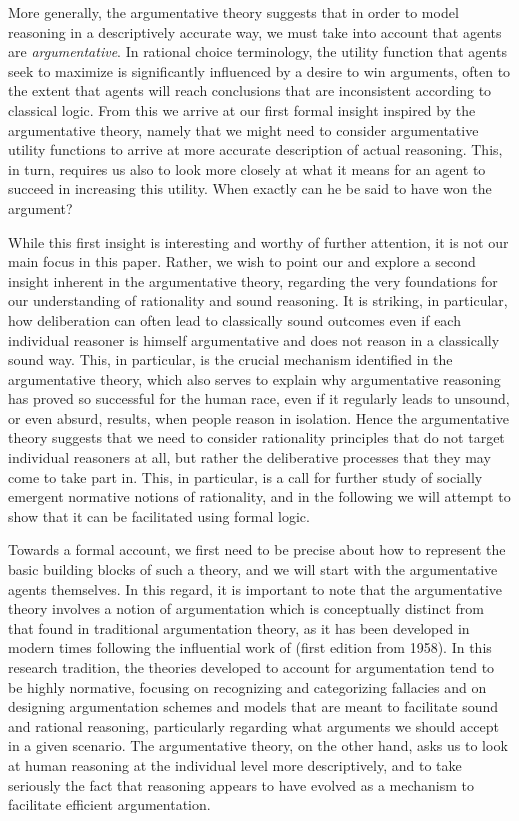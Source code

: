 \documentclass[greybox]{svmult}
\begin{document}
More generally, the argumentative theory suggests that in order to model reasoning in a descriptively accurate way, we must take into account that agents are \emph{argumentative}. In rational choice terminology, the utility function that agents seek to maximize is significantly influenced by a desire to win arguments, often to the extent that agents will reach conclusions that are inconsistent according to classical logic. From this we arrive at our first formal insight inspired by the argumentative theory, namely that we might need to consider argumentative utility functions to arrive at more accurate description of actual reasoning. This, in turn, requires us also to look more closely at what it means for an agent to succeed in increasing this utility. When exactly can he be said to have won the argument?

While this first insight is interesting and worthy of further attention, it is not our main focus in this paper. Rather, we wish to point our and explore a second insight inherent in the argumentative theory, regarding the 
very foundations for our understanding of rationality and sound reasoning. It is striking, in particular, how deliberation can often lead to classically sound outcomes even if each individual reasoner is himself argumentative and does not reason in a classically sound way. This, in particular, is the crucial mechanism identified in the argumentative theory, which also serves to explain why argumentative reasoning has proved so successful for the human race, even if it regularly leads to unsound, or even absurd, results, when people reason in isolation. Hence the argumentative theory suggests that we need to consider rationality principles that do not target individual reasoners at all, but rather the deliberative processes that they may come to take part in. This, in particular, is a call for further study of socially emergent normative notions of rationality, and in the following we will attempt to show that it can be facilitated using formal logic.

Towards a formal account, we first need to be precise about how to represent the basic building blocks of such a theory, and we will start with the argumentative agents themselves. In this regard, it is important to note that the argumentative theory involves a notion of argumentation which is conceptually distinct from that found in traditional argumentation theory, as it has been developed in modern times following the influential work of \cite{toulmin} (first edition from 1958). In this research tradition, the theories developed to account for argumentation tend to be highly normative, focusing on recognizing and categorizing fallacies and on designing argumentation schemes and models that are meant to facilitate sound and rational reasoning, particularly regarding what arguments we should accept in a given scenario. The argumentative theory, on the other hand, asks us to look at human reasoning at the individual level more descriptively, and to take seriously the fact that reasoning appears to have evolved as a mechanism to facilitate efficient argumentation. 
\end{document}
